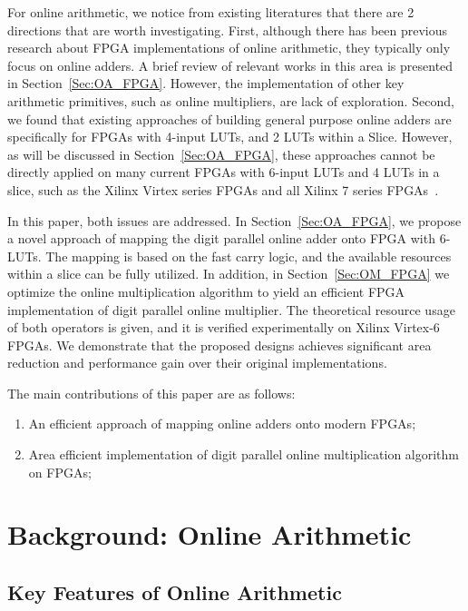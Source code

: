 \documentclass[conference]{IEEEtran}
\begin{document}
For online arithmetic, we notice from existing literatures that there are 2 directions that are worth investigating. First, although there has been previous research about FPGA implementations of online arithmetic, they typically only focus on online adders. A brief review of relevant works in this area is presented in Section~\ref{Sec:OA_FPGA}. However, the implementation of other key arithmetic primitives, such as online multipliers, are lack of exploration. Second, we found that existing approaches of building general purpose online adders are specifically for FPGAs with 4-input LUTs, and 2 LUTs within a Slice. However, as will be discussed in Section~\ref{Sec:OA_FPGA}, these approaches cannot be directly applied on many current FPGAs with 6-input LUTs and 4 LUTs in a slice, such as the Xilinx Virtex series FPGAs and all Xilinx 7 series FPGAs~\cite{Virtex7}. 

In this paper, both issues are addressed. In Section~\ref{Sec:OA_FPGA}, we propose a novel approach of mapping the digit parallel online adder onto FPGA with 6-LUTs. The mapping is based on the fast carry logic, and the available resources within a slice can be fully utilized. In addition, in Section~\ref{Sec:OM_FPGA} we optimize the online multiplication algorithm to yield an efficient FPGA implementation of digit parallel online multiplier. The theoretical resource usage of both operators is given, and it is verified experimentally on Xilinx Virtex-6 FPGAs. We demonstrate that the proposed designs achieves significant area reduction and performance gain over their original implementations.

The main contributions of this paper are as follows:
\begin{enumerate}
    \item An efficient approach of mapping online adders onto modern FPGAs;
    \item Area efficient implementation of digit parallel online multiplication algorithm on FPGAs;
\end{enumerate}



\section{Background: Online Arithmetic}\label{Sec:Background}
\subsection{Key Features of Online Arithmetic}
\end{document}
